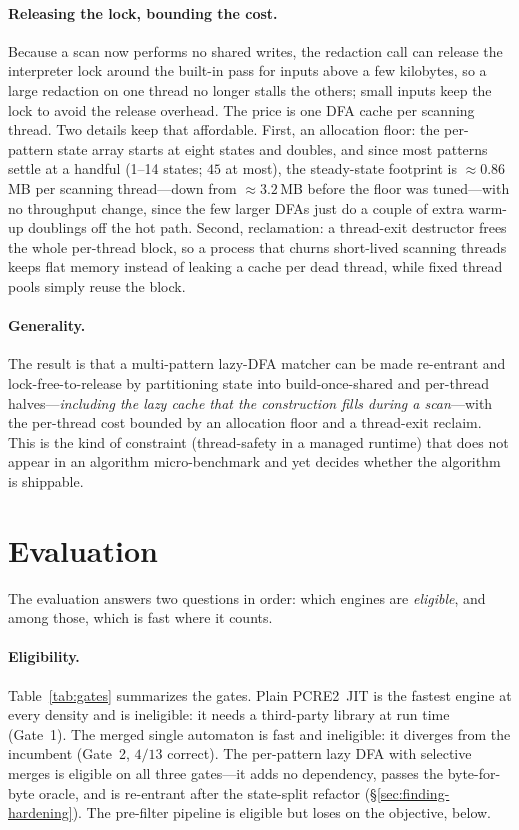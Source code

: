 \documentclass[acmsmall,nonacm,screen]{acmart}
\begin{document}
\paragraph{Releasing the lock, bounding the cost.} Because a scan now performs no
shared writes, the redaction call can release the interpreter lock around the
built-in pass for inputs above a few kilobytes, so a large redaction on one thread
no longer stalls the others; small inputs keep the lock to avoid the release
overhead. The price is one DFA cache per scanning thread. Two details keep that
affordable. First, an allocation floor: the per-pattern state array starts at
eight states and doubles, and since most patterns settle at a handful (1--14
states; \(45\) at most), the steady-state footprint is \(\approx\!0.86\)\,MB per
scanning thread---down from \(\approx\!3.2\)\,MB before the floor was tuned---with no
throughput change, since the few larger DFAs just do a couple of extra warm-up
doublings off the hot path. Second, reclamation: a thread-exit destructor frees the whole per-thread
block, so a process that churns short-lived scanning threads keeps flat memory
instead of leaking a cache per dead thread, while fixed thread pools simply reuse
the block.

\paragraph{Generality.} The result is that a multi-pattern lazy-DFA matcher can be
made re-entrant and lock-free-to-release by partitioning state into
build-once-shared and per-thread halves---\emph{including the lazy cache that the
construction fills during a scan}---with the per-thread cost bounded by an
allocation floor and a thread-exit reclaim. This is the kind of constraint
(thread-safety in a managed runtime) that does not appear in an algorithm
micro-benchmark and yet decides whether the algorithm is shippable.

\section{Evaluation}
\label{sec:eval}
The evaluation answers two questions in order: which engines are \emph{eligible},
and among those, which is fast where it counts.

\paragraph{Eligibility.} Table~\ref{tab:gates} summarizes the gates. Plain
PCRE2~JIT is the fastest engine at every density and is ineligible: it needs a
third-party library at run time (Gate~1). The merged single automaton is fast and
ineligible: it diverges from the incumbent (Gate~2, \(4/13\) correct). The
per-pattern lazy DFA with selective merges is eligible on all three gates---it adds
no dependency, passes the byte-for-byte oracle, and is re-entrant after the
state-split refactor (\S\ref{sec:finding-hardening}). The pre-filter pipeline is
eligible but loses on the objective, below.
\end{document}
